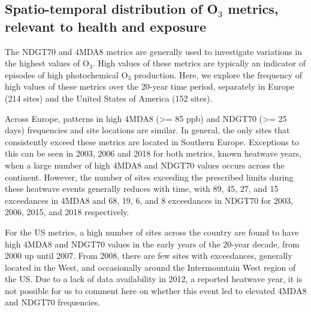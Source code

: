 \documentclass[journal abbreviation, manuscript]{copernicus}
\begin{document}
\subsection{Spatio-temporal distribution of O$_3$ metrics, relevant to health and exposure} \label{sect:metrics_distribution}

The NDGT70 and 4MDA8 metrics are generally used to investigate variations in the highest values of O$_3$. High values of these metrics are typically an indicator of episodes of high photochemical O$_3$ production. Here, we explore the frequency of high values of these metrics over the 20-year time period, separately in Europe (214 sites) and the United States of America (152 sites).

Across Europe, patterns in high 4MDA8 (>= 85 ppb) and NDGT70 (>= 25 days) frequencies and site locations are similar. In general, the only sites that consistently exceed these metrics are located in Southern Europe. Exceptions to this can be seen in 2003, 2006 and 2018 for both metrics, known heatwave years, when a large number of high 4MDA8 and NDGT70 values occurs across the continent. However, the number of sites exceeding the prescribed limits during these heatwave events generally reduces with time, with 89, 45, 27, and 15 exceedances in 4MDA8 and 68, 19, 6, and 8 exceedances in NDGT70 for 2003, 2006, 2015, and 2018 respectively.

For the US metrics, a high number of sites across the country are found to have high 4MDA8 and NDGT70 values in the early years of the 20-year decade, from 2000 up until 2007. From 2008, there are few sites with exceedances, generally located in the West, and occasionally around the Intermountain West region of the US. Due to a lack of data availability in 2012, a reported heatwave year, it is not possible for us to comment here on whether this event led to elevated 4MDA8 and NDGT70 frequencies. 
\end{document}
